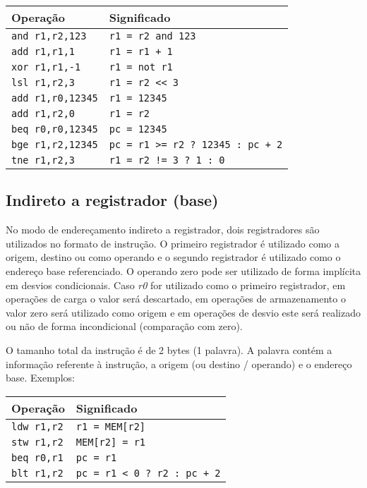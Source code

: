 \documentclass[11pt,a4paper]{report}
\begin{document}
\begin{table}[htb!]
\centering
\begin{tabular}{|p{5.0cm}|p{8.0cm}|}
\hline
\bf{Operação} & \bf{Significado} \\ \hline \hline
\texttt{and r1,r2,123} & \verb|r1 = r2 and 123| \\ \hline
\texttt{add r1,r1,1} & \verb|r1 = r1 + 1| \\ \hline
\texttt{xor r1,r1,-1} & \verb|r1 = not r1| \\ \hline
\texttt{lsl r1,r2,3} & \verb|r1 = r2 << 3| \\ \hline
\texttt{add r1,r0,12345} & \verb|r1 = 12345| \\ \hline
\texttt{add r1,r2,0} & \verb|r1 = r2| \\ \hline
\texttt{beq r0,r0,12345} & \verb|pc = 12345| \\ \hline
\texttt{bge r1,r2,12345} & \verb|pc = r1 >= r2 ? 12345 : pc + 2| \\ \hline
\texttt{tne r1,r2,3} & \verb|r1 = r2 != 3 ? 1 : 0| \\ \hline
\end{tabular}
\end{table}

\subsection{Indireto a registrador (base)}

No modo de endereçamento indireto a registrador, dois registradores são
utilizados no formato de instrução. O primeiro registrador é utilizado
como a origem, destino ou como operando e o segundo registrador é
utilizado como o endereço base referenciado. O operando zero pode ser
utilizado de forma implícita em desvios condicionais. Caso \textit{r0}
for utilizado como o primeiro registrador, em operações de carga o
valor será descartado, em operações de armazenamento o valor zero será
utilizado como origem e em operações de desvio este será realizado ou
não de forma incondicional (comparação com zero).

O tamanho total da instrução é de 2 bytes (1 palavra). A palavra contém
a informação referente à instrução, a origem (ou destino / operando) e o
endereço base. Exemplos:

\begin{table}[htb!]
\centering
\begin{tabular}{|p{5.0cm}|p{8.0cm}|}
\hline
\bf{Operação} & \bf{Significado} \\ \hline \hline
\texttt{ldw r1,r2} & \verb|r1 = MEM[r2]| \\ \hline
\texttt{stw r1,r2} & \verb|MEM[r2] = r1| \\ \hline
\texttt{beq r0,r1} & \verb|pc = r1| \\ \hline
\texttt{blt r1,r2} & \verb|pc = r1 < 0 ? r2 : pc + 2| \\ \hline
\end{tabular}
\end{table}
\end{document}
